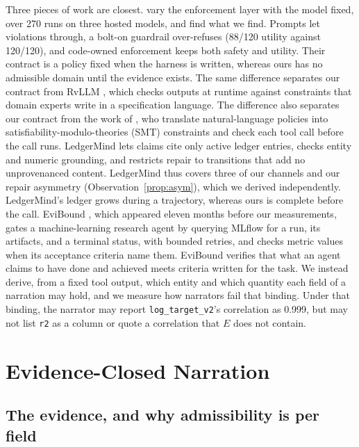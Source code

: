 \documentclass[smallextended,natbib]{svjour3}
\begin{document}
Three pieces of work are closest. \citet{ahn2026harness} vary the
enforcement layer with the model fixed, over 270 runs on three hosted models,
and find what we find. Prompts let violations through, a bolt-on guardrail
over-refuses (88/120 utility against 120/120), and code-owned enforcement keeps
both safety and utility. Their contract is a policy fixed when the harness
is written, whereas ours has no admissible domain until the evidence exists.
The same difference separates our contract from RvLLM \citep{zhang2025rvllm},
which checks outputs at runtime against constraints that domain experts write
in a specification language. The difference also separates our contract from
the work of \citet{winston2026solver}, who translate
natural-language policies into satisfiability-modulo-theories (SMT)
constraints and check each tool call before the call runs. LedgerMind \citep{du2026ledgermind} lets claims cite only
active ledger entries, checks entity and numeric grounding, and restricts
repair to transitions that add no unprovenanced content. LedgerMind thus
covers three of our channels and our repair asymmetry
(Observation~\ref{prop:asym}), which we derived independently. LedgerMind's
ledger grows during a trajectory, whereas ours is complete before the call.
EviBound \citep{chen2025evibound}, which appeared eleven months before our
measurements, gates a machine-learning research agent by querying MLflow for a
run, its artifacts, and a terminal status, with bounded retries, and checks
metric values when its acceptance criteria name them. EviBound verifies that
what an agent claims to have done and achieved meets criteria written for the
task. We instead derive, from a fixed tool output, which entity and which
quantity each field of a narration may hold, and we measure how narrators fail
that binding. Under that binding, the narrator may report
\texttt{log\_target\_v2}'s correlation as 0.999, but may not list \texttt{r2}
as a column or quote a correlation that $E$ does not contain.

\section{Evidence-Closed Narration}\label{sec:theory}

\subsection{The evidence, and why admissibility is per field}
\end{document}
